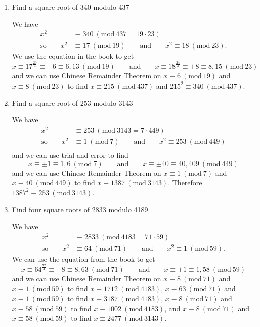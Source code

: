 \documentclass[a4paper, 11pt]{article}
\newcommand{\Mod}[1]{\ (\mathrm{mod}\ #1)}
\begin{document}
    \begin{enumerate}[label=(\alph*)]
        \item Find a square root of 340 modulo 437
        
        We have
        \begin{align*}
            x^2 &\equiv 340 \Mod{437=19\cdot23}\\
            \text{so}\qquad x^2 &\equiv 17\Mod{19} \qquad \text{and} \qquad x^2\equiv 18\Mod{23}.
        \end{align*}
        We use the equation in the book to get
        \begin{equation*}
            x\equiv 17^\frac{20}{4} \equiv \pm 6 \equiv 6, 13\Mod{19} \qquad \text{and} \qquad x\equiv 18^\frac{24}{4} \equiv \pm 8 \equiv 8, 15\Mod{23}
        \end{equation*}
        and we can use Chinese Remainder Theorem on $x\equiv 6 \Mod{19}$ and $x\equiv 8\Mod{23}$ to find $x\equiv215\Mod{437}$ and $215^2\equiv340\Mod{437}$.
        
        \item Find a square root of 253 modulo 3143
        
        We have
        \begin{align*}
            x^2 &\equiv 253 \Mod{3143=7\cdot449}\\
            \text{so}\qquad x^2 &\equiv 1\Mod{7} \qquad \text{and} \qquad x^2\equiv 253\Mod{449}\\
        \end{align*}
        and we can use trial and error to find
        \begin{equation*}
            x\equiv \pm 1 \equiv 1,6 \Mod{7} \qquad \text{and} \qquad x \equiv \pm 40 \equiv 40, 409\Mod{449}
        \end{equation*}
        and we can use Chinese Remainder Theorem on $x\equiv 1 \Mod{7}$ and $x\equiv 40\Mod{449}$ to find $x\equiv1387\Mod{3143}$. Therefore $1387^2\equiv253\Mod{3143}$.
        
        \item Find four square roots of 2833 modulo 4189
        
        We have
        \begin{align*}
            x^2 &\equiv 2833 \Mod{4183=71\cdot59}\\
            \text{so}\qquad x^2 &\equiv 64\Mod{71} \qquad \text{and} \qquad x^2\equiv 1\Mod{59}.
        \end{align*}
        We can use the equation from the book to get
        \begin{equation*}
            x\equiv 64^\frac{72}{4} \equiv \pm 8 \equiv 8,63 \Mod{71} \qquad \text{and} \qquad x \equiv \pm 1 \equiv 1, 58\Mod{59}
        \end{equation*}
        and we can use Chinese Remainder Theorem on $x\equiv 8 \Mod{71}$ and $x\equiv 1\Mod{59}$ to find $x\equiv1712\Mod{4183}$, $x\equiv 63 \Mod{71}$ and $x\equiv 1\Mod{59}$ to find $x\equiv3187\Mod{4183}$, $x\equiv 8 \Mod{71}$ and $x\equiv 58\Mod{59}$ to find $x\equiv1002\Mod{4183}$, and $x\equiv 8 \Mod{71}$ and $x\equiv 58\Mod{59}$ to find $x\equiv2477\Mod{3143}$.
        

\end{enumerate}
\end{document}
